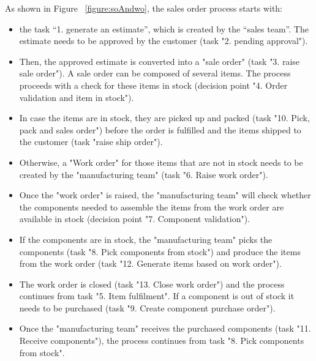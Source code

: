 As shown in Figure ~\ref{figure:soAndwo}, the sales order process starts with:

\begin{itemize}
    \item the task “1. generate an estimate”, which is created by the “sales team”. The estimate needs to be approved by the customer (task "2. pending approval").
    \item Then, the approved estimate is converted into a  "sale order" (task "3. raise sale order"). A sale order can be  composed of several items. The process proceeds with a check for these items in stock (decision point "4. Order validation and item in stock").
    \item In case the items are in stock, they are picked up and packed (task "10. Pick, pack and sales order") before the order is fulfilled and the items shipped to the customer (task "raise ship order").
    \item Otherwise, a "Work order" for those items that are not in stock needs to be created by the "manufacturing team" (task "6. Raise work order").
    \item Once the "work order" is raised, the "manufacturing team" will check whether the components needed to assemble the items from the work order are available in stock (decision point "7. Component validation").
    \item If the components are in stock, the "manufacturing team" picks the components (task "8. Pick components from stock") and produce the items from the work order (task "12. Generate items based on work order").
    \item The work order is closed (task "13. Close work order") and the process continues from task "5. Item fulfilment". If a component is out of stock it needs to be purchased (task "9. Create component purchase order").
    \item Once the "manufacturing team" receives  the purchased components (task "11. Receive components"), the process continues from task "8. Pick components from stock".
\end{itemize}

